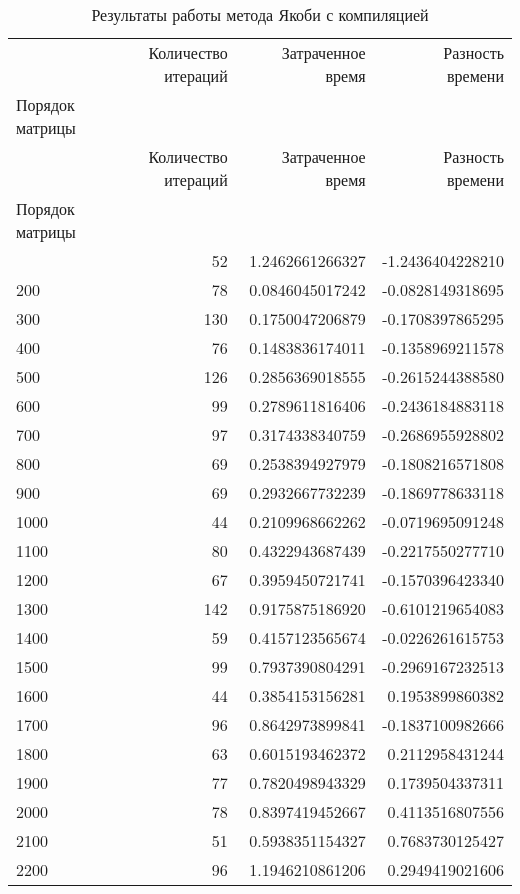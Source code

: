 \begin{longtable}{lrrr}

\caption{Результаты работы метода Якоби с компиляцией}\\
\toprule
 & Количество итераций & Затраченное время & Разность времени \\
Порядок матрицы &  &  &  \\
\midrule
\endfirsthead
\toprule
 & Количество итераций & Затраченное время & Разность времени \\
Порядок матрицы &  &  &  \\
\midrule
\endhead
\midrule
\midrule
\endfoot
\bottomrule
\endlastfoot
100 & 52 & 1.2462661266327 & -1.2436404228210 \\
200 & 78 & 0.0846045017242 & -0.0828149318695 \\
300 & 130 & 0.1750047206879 & -0.1708397865295 \\
400 & 76 & 0.1483836174011 & -0.1358969211578 \\
500 & 126 & 0.2856369018555 & -0.2615244388580 \\
600 & 99 & 0.2789611816406 & -0.2436184883118 \\
700 & 97 & 0.3174338340759 & -0.2686955928802 \\
800 & 69 & 0.2538394927979 & -0.1808216571808 \\
900 & 69 & 0.2932667732239 & -0.1869778633118 \\
1000 & 44 & 0.2109968662262 & -0.0719695091248 \\
1100 & 80 & 0.4322943687439 & -0.2217550277710 \\
1200 & 67 & 0.3959450721741 & -0.1570396423340 \\
1300 & 142 & 0.9175875186920 & -0.6101219654083 \\
1400 & 59 & 0.4157123565674 & -0.0226261615753 \\
1500 & 99 & 0.7937390804291 & -0.2969167232513 \\
1600 & 44 & 0.3854153156281 & 0.1953899860382 \\
1700 & 96 & 0.8642973899841 & -0.1837100982666 \\
1800 & 63 & 0.6015193462372 & 0.2112958431244 \\
1900 & 77 & 0.7820498943329 & 0.1739504337311 \\
2000 & 78 & 0.8397419452667 & 0.4113516807556 \\
2100 & 51 & 0.5938351154327 & 0.7683730125427 \\
2200 & 96 & 1.1946210861206 & 0.2949419021606 \\

\end{longtable}

